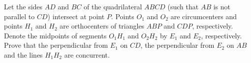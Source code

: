 Let the sides $AD$ and $BC$ of the quadrilateral $ABCD$ (such that $AB$ is not parallel to $CD$) intersect at point $P$. Points $O_1$ and $O_2$ are circumcenters and points $H_1$ and $H_2$ are orthocenters of triangles $ABP$ and $CDP$,  respectively. Denote the midpoints of segments $O_1H_1$ and $O_2H_2$ by $E_1$ and $E_2$,  respectively. Prove that the perpendicular from $E_1$ on $CD$,  the perpendicular from $E_2$ on $AB$ and the lines $H_1H_2$ are concurrent.